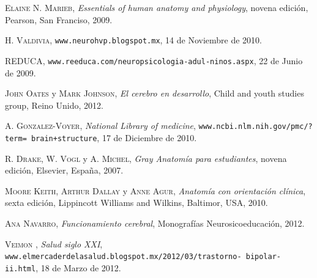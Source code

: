 \documentclass[fisica]{fcfmtesis}
\begin{document}
\backmatter
{}

\begin{thebibliography}{99}
	 \textsc{Elaine N. Marieb}, \textit{Essentials of human anatomy and physiology},  novena edición, Pearson, San Franciso, 2009.
	
	 \textsc{H. Valdivia}, \texttt{www.neurohvp.blogspot.mx}, 14 de Noviembre de 2010.
		
	 \textsc{REDUCA}, \texttt{www.reeduca.com/neuropsicologia-adul-ninos.aspx}, 22 de Junio de 2009.
	
	 \textsc{John Oates} y \textsc{Mark Johnson}, \textit{El cerebro en desarrollo},  Child and youth studies group, Reino Unido, 2012.
	
	 \textsc{A. Gonzalez-Voyer}, \textit{National Library of medicine}, \texttt{www.ncbi.nlm.nih.gov/pmc/?term= brain+structure}, 17 de Diciembre de 2010.
	
	 \textsc{R. Drake, W. Vogl} y \textsc{A. Michel}, \textit{Gray Anatomía para estudiantes},  novena edición, Elsevier, España, 2007.
	
	 \textsc{Moore Keith, Arthur Dallay} y \textsc{Anne Agur},  \textit{Anatomía con orientación clínica}, sexta edición, Lippincott Williams and Wilkins, Baltimor, USA, 2010.
	
	 \textsc{Ana Navarro},  \textit{Funcionamiento cerebral}, Monografías Neurosicoeducación, 2012.
	
	 \textsc{Veimon} , \textit{Salud siglo XXI}, \texttt{www.elmercaderdelasalud.blogspot.mx/2012/03/trastorno- bipolar-ii.html}, 18 de Marzo de 2012.
\end{thebibliography}
\end{document}
